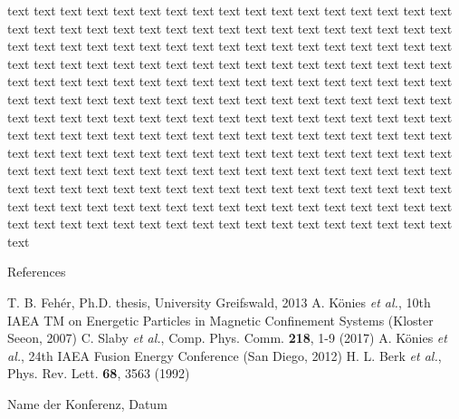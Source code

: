 \documentclass[final]{beamer} %
\begin{document}
\begin{frame}
\begin{minipage}[t]{.49\textwidth}
\begin{kasten}{\large text}
			text text text text text text text text text text text text text 
			text text text text text text text text text text text text text 
			text text text text text text text text text text text text text 
			text text text text text text text text text text text text text 
			text text text text text text text text text text text text text 
			text text text text text text text text text text text text text 
			text text text text text text text text text text text text text 
			text text text text text text text text text text text text text 
			text text text text text text text text text text text text text 
			text text text text text text text text text text text text text 
			text text text text text text text text text text text text text 
			text text text text text text text text text text text text text 
			text text text text text text text text text text text text text 
			text text text text text text text text text text text text text 
			text text text text text text text text text text text text text 
			text text text text text text text text text text text text text 
			text text text text text text text text text text text text text 
    \end{kasten}
		
		
    \begin{kasten}{\large References}
      \small
      \begin{thebibliography}{}
         T. B. Feh\'er, Ph.D. thesis, University   Greifswald, 2013
         A. K\"onies \textit{et al.}, 10th IAEA TM on Energetic Particles in Magnetic Confinement Systems (Kloster Seeon, 2007)
         C. Slaby \textit{et al.}, Comp. Phys. Comm. \textbf{218}, 1-9 (2017)
         A. K\"onies \textit{et al.}, 24th IAEA Fusion Energy Conference (San Diego, 2012)
         H. L. Berk \textit{et al.}, Phys. Rev. Lett. \textbf{68}, 3563 (1992)
      \end{thebibliography}
    \end{kasten}

  \end{minipage}
   \vfill
  \centerline{\tiny Name der Konferenz, Datum} 
  \end{frame}
\end{document}
